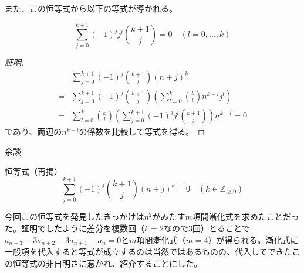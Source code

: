 \documentclass[dvipdfmx]{beamer}
\begin{document}
\begin{frame}
	また、この恒等式から以下の等式が導かれる。
	\begin{block}{}
		\[
			\sum_{j=0}^{k+1} (-1)^j j^l \binom{k+1}{j} = 0 \quad (l = 0, \ldots, k)
		\]
	\end{block}
	\pause
	\begin{proof}[証明]
		\begin{align}
			  & \sum_{j=0}^{k+1} (-1)^j \binom{k+1}{j} (n+j)^k \\
			= & \sum_{j=0}^{k+1} (-1)^j \binom{k+1}{j} \left( \sum_{l=0}^k \binom{k}{l} n^{k-l} j^l \right)     \\
			= & \sum_{l=0}^k \binom{k}{l} \left( \sum_{j=0}^{k+1} (-1)^j j^l \binom{k+1}{j} \right) n^{k-l} = 0
		\end{align}
		であり、両辺の$n^{k-l}$の係数を比較して等式を得る。
	\end{proof}
\end{frame}

\begin{frame}{余談}
	\begin{block}{恒等式（再掲）}
		\[
			\sum_{j=0}^{k+1} (-1)^j \binom{k+1}{j} (n+j)^k = 0 \quad (k \in \mathbb{Z}_{\ge 0})
		\]
	\end{block}
	今回この恒等式を発見したきっかけは$n^2$がみたす$m$項間漸化式を求めたことだった。証明でしたように差分を複数回（$k=2$なので$3$回）とることで$a_{n+3} - 3 a_{n+2} + 3 a_{n+1} - a_n = 0$と$m$項間漸化式（$m=4$）が得られる。漸化式に一般項を代入すると等式が成立するのは当然ではあるものの、代入してできたこの恒等式の非自明さに惹かれ、紹介することにした。
\end{frame}
\end{document}
